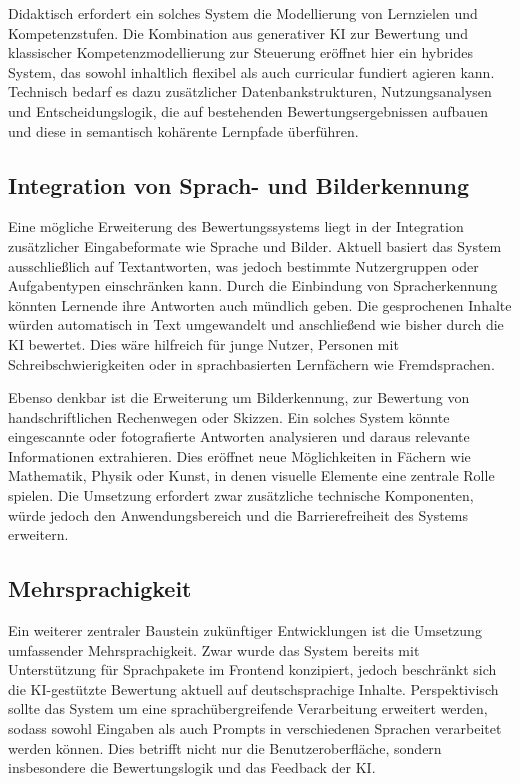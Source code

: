 \documentclass[a4paper,12pt]{article}
\begin{document}
Didaktisch erfordert ein solches System die Modellierung von Lernzielen und Kompetenzstufen. Die Kombination aus generativer KI zur Bewertung und klassischer Kompetenzmodellierung zur Steuerung eröffnet hier ein hybrides System, das sowohl inhaltlich flexibel als auch curricular fundiert agieren kann. Technisch bedarf es dazu zusätzlicher Datenbankstrukturen, Nutzungsanalysen und Entscheidungslogik, die auf bestehenden Bewertungsergebnissen aufbauen und diese in semantisch kohärente Lernpfade überführen.

\subsection{Integration von Sprach- und Bilderkennung}
Eine mögliche Erweiterung des Bewertungssystems liegt in der Integration zusätzlicher Eingabeformate wie Sprache und Bilder. Aktuell basiert das System ausschließlich auf Textantworten, was jedoch bestimmte Nutzergruppen oder Aufgabentypen einschränken kann. Durch die Einbindung von Spracherkennung könnten Lernende ihre Antworten auch mündlich geben. Die gesprochenen Inhalte würden automatisch in Text umgewandelt und anschließend wie bisher durch die KI bewertet. Dies wäre hilfreich für junge Nutzer, Personen mit Schreibschwierigkeiten oder in sprachbasierten Lernfächern wie Fremdsprachen.

Ebenso denkbar ist die Erweiterung um Bilderkennung, zur Bewertung von handschriftlichen Rechenwegen oder Skizzen. Ein solches System könnte eingescannte oder fotografierte Antworten analysieren und daraus relevante Informationen extrahieren. Dies eröffnet neue Möglichkeiten in Fächern wie Mathematik, Physik oder Kunst, in denen visuelle Elemente eine zentrale Rolle spielen. Die Umsetzung erfordert zwar zusätzliche technische Komponenten, würde jedoch den Anwendungsbereich und die Barrierefreiheit des Systems erweitern.

\subsection{Mehrsprachigkeit}
Ein weiterer zentraler Baustein zukünftiger Entwicklungen ist die Umsetzung umfassender Mehrsprachigkeit. Zwar wurde das System bereits mit Unterstützung für Sprachpakete im Frontend konzipiert, jedoch beschränkt sich die KI-gestützte Bewertung aktuell auf deutschsprachige Inhalte. Perspektivisch sollte das System um eine sprachübergreifende Verarbeitung erweitert werden, sodass sowohl Eingaben als auch Prompts in verschiedenen Sprachen verarbeitet werden können. Dies betrifft nicht nur die Benutzeroberfläche, sondern insbesondere die Bewertungslogik und das Feedback der KI.
\end{document}
